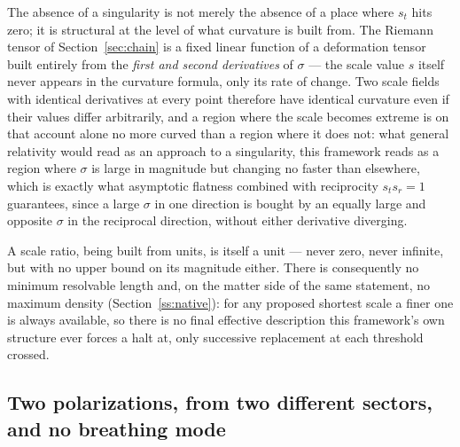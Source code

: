 \documentclass[aps,prd,twocolumn,superscriptaddress,nofootinbib]{revtex4-2}
\begin{document}
The absence of a singularity is not merely the absence of a place where
$s_t$ hits zero; it is structural at the level of what curvature is
built from. The Riemann tensor of Section~\ref{sec:chain} is a fixed
linear function of a deformation tensor built entirely from the
\emph{first and second derivatives} of $\sigma$ — the scale value $s$
itself never appears in the curvature formula, only its rate of change.
Two scale fields with identical derivatives at every point therefore
have identical curvature even if their values differ arbitrarily, and a
region where the scale becomes extreme is on that account alone no more
curved than a region where it does not: what general relativity would
read as an approach to a singularity, this framework reads as a region
where $\sigma$ is large in magnitude but changing no faster than
elsewhere, which is exactly what asymptotic flatness combined with
reciprocity $s_ts_r=1$ guarantees, since a large $\sigma$ in one
direction is bought by an equally large and opposite $\sigma$ in the
reciprocal direction, without either derivative diverging.

A scale ratio, being built from units, is itself a unit — never zero,
never infinite, but with no upper bound on its magnitude either. There
is consequently no minimum resolvable length and, on the matter side of
the same statement, no maximum density
(Section~\ref{ss:native}): for any proposed shortest scale a finer one
is always available, so there is no final effective description this
framework's own structure ever forces a halt at, only successive
replacement at each threshold crossed.

\subsection{Two polarizations, from two different sectors, and no breathing mode}\label{ss:pol}
\end{document}
